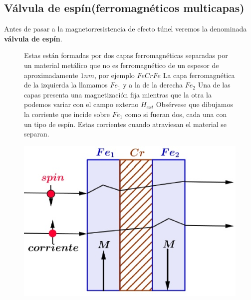 \subsection{Válvula de espín(ferromagnéticos multicapas)}
Antes de pasar a la magnetorresistencia de efecto túnel veremos la denominada \textbf{válvula de espín}.




\begin{figure}[H]
  \begin{minipage}[b]{0.47\textwidth}
Estas están formadas por dos capas ferromagnéticas separadas por un material metálico que no es ferromagnético de un espesor de aproximadamente $1nm$, por ejemplo $FeCrFe$ La capa ferromagnética de la izquierda la llamamos $Fe_{1}$ y a la de la derecha $Fe_{2}$ Una de las capas presenta una magnetización fija mientras que la otra la podemos variar con el campo externo $H_{ext}$ Obsérvese que dibujamos la corriente que incide sobre $Fe_{1}$ como si fueran dos, cada una con un tipo de espín. Estas
corrientes cuando atraviesan el material se separan.
  \vspace{0cm}
  \end{minipage}
  \hfill
  \begin{minipage}[b]{0.47\textwidth}
     \includegraphics[width=1.0\textwidth]{./Figures/fig336}
	\label{fig:336}
	  \vspace{1.5cm}
  \end{minipage}
\end{figure}


